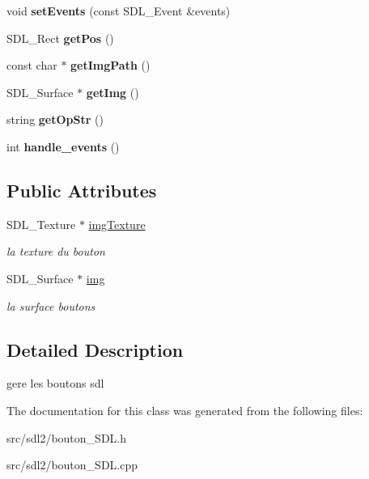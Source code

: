 \begin{DoxyCompactItemize}
\item 
void {\bfseries set\+Events} (const S\+D\+L\+\_\+\+Event \&events)\hypertarget{classBouton_a406660bf2b0676abd4e2e6c66bf6a539}{}\label{classBouton_a406660bf2b0676abd4e2e6c66bf6a539}

\item 
S\+D\+L\+\_\+\+Rect {\bfseries get\+Pos} ()\hypertarget{classBouton_afdc73d0def4de4c306203b455e7a15b2}{}\label{classBouton_afdc73d0def4de4c306203b455e7a15b2}

\item 
const char $\ast$ {\bfseries get\+Img\+Path} ()\hypertarget{classBouton_a68bbb5d5ffa137a180ac0b783814916f}{}\label{classBouton_a68bbb5d5ffa137a180ac0b783814916f}

\item 
S\+D\+L\+\_\+\+Surface $\ast$ {\bfseries get\+Img} ()\hypertarget{classBouton_ab38fc1260547b081afdfaba4bb79d026}{}\label{classBouton_ab38fc1260547b081afdfaba4bb79d026}

\item 
string {\bfseries get\+Op\+Str} ()\hypertarget{classBouton_a9944a8858bc05907bfd8e0257e5a72e7}{}\label{classBouton_a9944a8858bc05907bfd8e0257e5a72e7}

\item 
int {\bfseries handle\+\_\+events} ()\hypertarget{classBouton_a54efaa0d29dae4e2dddbfcac50cd0242}{}\label{classBouton_a54efaa0d29dae4e2dddbfcac50cd0242}

\end{DoxyCompactItemize}
\subsection*{Public Attributes}
\begin{DoxyCompactItemize}
\item 
S\+D\+L\+\_\+\+Texture $\ast$ \hyperlink{classBouton_a5aadbaa251e0c19fc79766fe7ffc2df2}{img\+Texture}\hypertarget{classBouton_a5aadbaa251e0c19fc79766fe7ffc2df2}{}\label{classBouton_a5aadbaa251e0c19fc79766fe7ffc2df2}

\begin{DoxyCompactList}\small\item\em la texture du bouton \end{DoxyCompactList}\item 
S\+D\+L\+\_\+\+Surface $\ast$ \hyperlink{classBouton_afd4eec5ab957ff9bc30c4b11c3d6cb10}{img}\hypertarget{classBouton_afd4eec5ab957ff9bc30c4b11c3d6cb10}{}\label{classBouton_afd4eec5ab957ff9bc30c4b11c3d6cb10}

\begin{DoxyCompactList}\small\item\em la surface boutons \end{DoxyCompactList}\end{DoxyCompactItemize}


\subsection{Detailed Description}
gere les boutons sdl 

The documentation for this class was generated from the following files\+:\begin{DoxyCompactItemize}
\item 
src/sdl2/bouton\+\_\+\+S\+D\+L.\+h\item 
src/sdl2/bouton\+\_\+\+S\+D\+L.\+cpp\end{DoxyCompactItemize}

